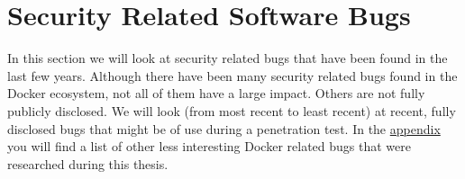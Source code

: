 \section{Security Related Software Bugs}\label{section:bugs}
In this section we will look at security related bugs that have been found in the last few years. Although there have been many security related bugs found in the Docker ecosystem, not all of them have a large impact. Others are not fully publicly disclosed. We will look (from most recent to least recent) at recent, fully disclosed bugs that might be of use during a penetration test. In the \hyperref[appendix:CVE-List]{appendix} you will find a list of other less interesting Docker related bugs that were researched during this thesis.








